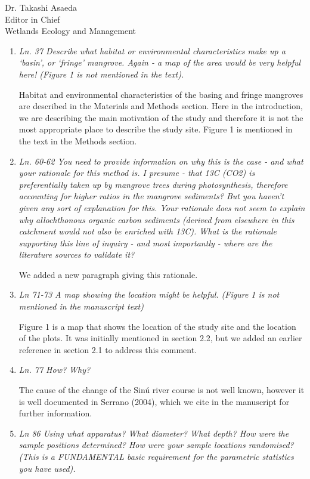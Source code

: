 \documentclass[11pt]{bgcletter}
\begin{document}
\begin{letter}{Dr. Takashi Asaeda\\
 Editor in Chief \\ Wetlands Ecology and Management}
\begin{enumerate}
\item {\it Ln. 37 Describe what habitat or environmental characteristics make up a `basin', or `fringe' mangrove. Again - a map of the area would be very helpful here! (Figure 1 is not mentioned in the text).}

{\color{blue} Habitat and environmental characteristics of the basing and fringe mangroves are described in the Materials and Methods section. Here in the introduction, we are describing the main motivation of the study and therefore it is not the most appropriate place to describe the study site. Figure 1 is mentioned in the text in the Methods section.}

\item {\it Ln. 60-62 You need to provide information on why this is the case - and what your rationale for this method is. I presume - that 13C (CO2) is preferentially taken up by mangrove trees during photosynthesis, therefore accounting for higher ratios in the mangrove sediments? But you haven't given any sort of explanation for this. Your rationale does not seem to explain why allochthonous organic carbon sediments (derived from elsewhere in this catchment would not also be enriched with 13C). What is the rationale supporting this line of inquiry - and most importantly - where are the literature sources to validate it?}

{\color{blue} We added a new paragraph giving this rationale. }

\item {\it Ln 71-73 A map showing the location might be helpful. (Figure 1 is not mentioned in the manuscript text)}

{\color{blue} Figure 1 is a map that shows the location of the study site and the location of the plots. It was initially mentioned in section 2.2, but we added an earlier reference in section 2.1 to address this comment.}

\item {\it Ln. 77 How? Why?}

{\color{blue} The cause of the change of the Sin\'u river course is not well known, however it is well documented in Serrano (2004), which we cite in the manuscript for further information.}

\item {\it Ln 86 Using what apparatus? What diameter? What depth? How were the sample positions determined? How were your sample locations randomised? (This is a FUNDAMENTAL basic requirement for the parametric statistics you have used).}


\end{enumerate}
\end{letter}
\end{document}
